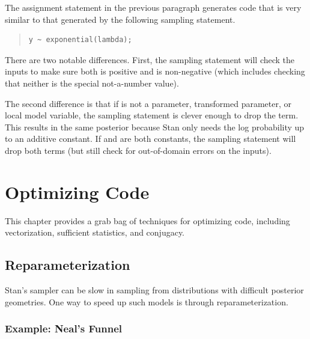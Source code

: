 The assignment statement in the previous paragraph generates 
\Cpp code that is very similar to that generated by the following
sampling statement.
%
\begin{quote}
\begin{Verbatim}
y ~ exponential(lambda);
\end{Verbatim}
\end{quote}
%
There are two notable differences.  First, the sampling statement will
check the inputs to make sure both  is positive and
 is non-negative (which includes checking that neither is the
special not-a-number value).

The second difference is that if  is not a parameter,
transformed parameter, or local model variable, the sampling statement
is clever enough to drop the  term.  This results in
the same posterior because Stan only needs the log probability up to
an additive constant.  If  and  are both
constants, the sampling statement will drop both terms (but still
check for out-of-domain errors on the inputs).

\chapter{Optimizing \Stan Code}\label{optimization.chapter}
\noindent
This chapter provides a grab bag of techniques for optimizing \Stan
code, including vectorization, sufficient statistics, and conjugacy.

\section{Reparameterization}

Stan's sampler can be slow in sampling from distributions with
difficult posterior geometries.  One way to speed up such models is
through reparameterization.

\subsection{Example: Neal's Funnel}

